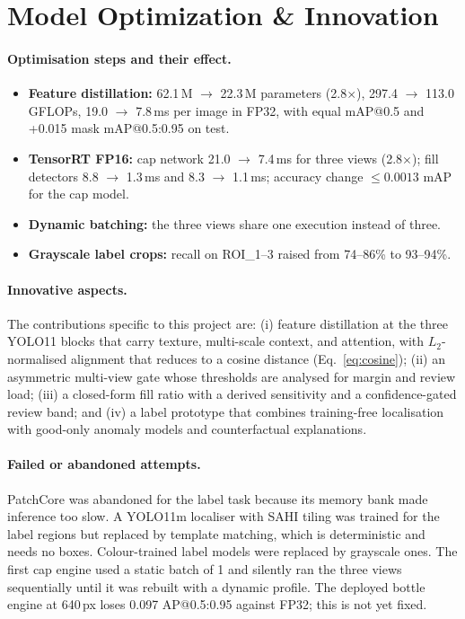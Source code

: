 \section{Model Optimization \& Innovation}
\label{sec:model-optimization}

\paragraph{Optimisation steps and their effect.}
\begin{itemize}
    \item \textbf{Feature distillation:} 62.1\,M $\rightarrow$ 22.3\,M parameters (2.8$\times$), 297.4 $\rightarrow$ 113.0 GFLOPs, 19.0 $\rightarrow$ 7.8\,ms per image in FP32, with equal mAP@0.5 and +0.015 mask mAP@0.5:0.95 on test.
    \item \textbf{TensorRT FP16:} cap network 21.0 $\rightarrow$ 7.4\,ms for three views (2.8$\times$); fill detectors 8.8 $\rightarrow$ 1.3\,ms and 8.3 $\rightarrow$ 1.1\,ms; accuracy change $\leq0.0013$ mAP for the cap model.
    \item \textbf{Dynamic batching:} the three views share one execution instead of three.
    \item \textbf{Grayscale label crops:} recall on ROI\_1--3 raised from 74--86\% to 93--94\%.
\end{itemize}

\paragraph{Innovative aspects.} The contributions specific to this project are: (i) feature distillation at the three YOLO11 blocks that carry texture, multi-scale context, and attention, with $L_2$-normalised alignment that reduces to a cosine distance (Eq.~\eqref{eq:cosine}); (ii) an asymmetric multi-view gate whose thresholds are analysed for margin and review load; (iii) a closed-form fill ratio with a derived sensitivity and a confidence-gated review band; and (iv) a label prototype that combines training-free localisation with good-only anomaly models and counterfactual explanations.

\paragraph{Failed or abandoned attempts.} PatchCore was abandoned for the label task because its memory bank made inference too slow. A YOLO11m localiser with SAHI tiling was trained for the label regions but replaced by template matching, which is deterministic and needs no boxes. Colour-trained label models were replaced by grayscale ones. The first cap engine used a static batch of 1 and silently ran the three views sequentially until it was rebuilt with a dynamic profile. The deployed bottle engine at 640\,px loses 0.097 AP@0.5:0.95 against FP32; this is not yet fixed.

